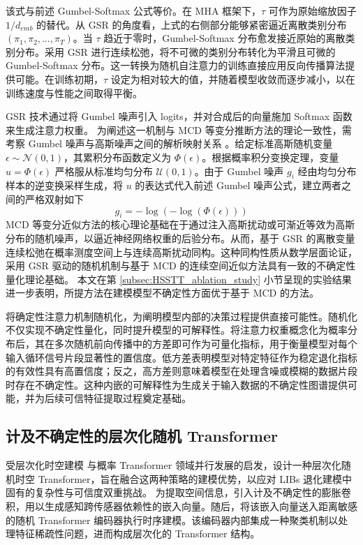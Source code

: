 该式与前述 Gumbel-Softmax 公式等价。在 MHA 框架下，$\tau$ 可作为原始缩放因子 $1/d_{emb}$ 的替代。从 GSR 的角度看，上式的右侧部分能够紧密逼近离散类别分布 $(\pi_1, \pi_2, \dots, \pi_T)$。当 $\tau$ 趋近于零时，Gumbel-Softmax 分布愈发接近原始的离散类别分布。采用 GSR 进行连续松弛，将不可微的类别分布转化为平滑且可微的 Gumbel-Softmax 分布。这一转换为随机自注意力的训练直接应用反向传播算法提供可能。在训练初期，$\tau$ 设定为相对较大的值，并随着模型收敛而逐步减小，以在训练速度与性能之间取得平衡。

GSR 技术通过将 Gumbel 噪声引入 logits，并对合成后的向量施加 Softmax 函数来生成注意力权重。
% 
为阐述这一机制与 MCD 等变分推断方法的理论一致性，需考察 Gumbel 噪声与高斯噪声之间的解析映射关系 \cite{potapczynski2020invertible}。给定标准高斯随机变量 $\epsilon \sim \mathcal{N}(0, 1)$，其累积分布函数定义为 $\Phi(\epsilon)$。根据概率积分变换定理，变量 $u = \Phi(\epsilon)$ 严格服从标准均匀分布 $\mathcal{U}(0, 1)$。由于 Gumbel 噪声 $g_i$ 经由均匀分布样本的逆变换采样生成，将 $u$ 的表达式代入前述 Gumbel 噪声公式，建立两者之间的严格双射如下
% 
\begin{equation}
  g_i = -\log(-\log(\Phi(\epsilon)))
\end{equation}
% 
MCD 等变分近似方法的核心理论基础在于通过注入高斯扰动或可渐近等效为高斯分布的随机噪声，以逼近神经网络权重的后验分布。从而，基于 GSR 的离散变量连续松弛在概率测度空间上与连续高斯扰动同构。这种同构性质从数学层面论证，采用 GSR 驱动的随机机制与基于 MCD 的连续空间近似方法具有一致的不确定性量化理论基础。
% 
本文在第 \ref{subsec:HSSTT_ablation_study} 小节呈现的实验结果进一步表明，所提方法在建模模型不确定性方面优于基于 MCD 的方法。

将确定性注意力机制随机化，为阐明模型内部的决策过程提供直接可能性。随机化不仅实现不确定性量化，同时提升模型的可解释性。将注意力权重概念化为概率分布后，其在多次随机前向传播中的方差即可作为可量化指标，用于衡量模型对每个输入循环信号片段显著性的置信度。低方差表明模型对特定特征作为稳定退化指标的有效性具有高置信度；反之，高方差则意味着模型在处理含噪或模糊的数据片段时存在不确定性。这种内嵌的可解释性为生成关于输入数据的不确定性图谱提供可能，并为后续可信特征提取过程奠定基础。

\subsection{计及不确定性的层次化随机 Transformer}\label{subsec:hierarchical_spatialtemporal}

受层次化时空建模 \cite{qianhstformerhierarchicalspatialtemporaltransformers} 与概率 Transformer \cite{9879185} 领域并行发展的启发，设计一种层次化随机时空 Transformer，旨在融合这两种策略的建模优势，以应对 LIBs 退化建模中固有的复杂性与可信度双重挑战。
% 
为提取空间信息，引入计及不确定性的膨胀卷积，用以生成感知跨传感器依赖性的嵌入向量。随后，将该嵌入向量送入距离敏感的随机 Transformer 编码器执行时序建模。该编码器内部集成一种聚类机制以处理特征稀疏性问题，进而构成层次化的 Transformer 结构。

